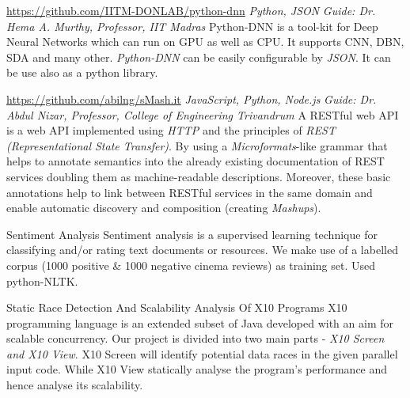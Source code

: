 \documentclass[11pt, a4paper, sans]{moderncv}
\begin{document}
{\newline \url{https://github.com/IITM-DONLAB/python-dnn}}
{\hfill \textit{Python, JSON}}
{\newline \textit{Guide: Dr. Hema A. Murthy, Professor, IIT Madras}}
{Python-DNN is a tool-kit for Deep Neural Networks which can run on GPU as well as CPU. It supports CNN, DBN, SDA and many other. \textit{Python-DNN} can be easily configurable by \textit{JSON}. It can be use also as a python library. \newline}

{\newline \url{https://github.com/abilng/sMash.it}}
{\hfill \textit{JavaScript, Python, Node.js}}
{\newline \textit{Guide: Dr. Abdul Nizar, Professor, College of Engineering Trivandrum}}
{A RESTful web API is a web API implemented using \textit{HTTP }and the principles of \textit{REST (Representational State Transfer)}. By using  a \textit{Microformats}-like grammar that helps to annotate semantics into the already existing documentation of REST services doubling them as machine-readable descriptions. Moreover, these basic annotations help to link between RESTful services in the same domain and enable automatic discovery and composition (creating \textit{Mashups}). \newline}

\iffalse


{Sentiment Analysis}{}{}{}
{Sentiment analysis is a supervised learning technique for classifying and/or rating text documents or resources. We make use of a labelled corpus (1000 positive \& 1000 negative cinema reviews) as training set. Used python-NLTK. \newline}

{Static Race Detection And Scalability Analysis Of X10 Programs}{}{}{}
{X10 programming language is an extended subset of Java developed with an aim for
scalable concurrency. Our project is divided into two main parts - \textit{X10 Screen and X10 View}. X10 Screen will identify potential data races in the given parallel input code. While X10 View statically analyse the program's performance and hence analyse its scalability. \newline}
\end{document}
